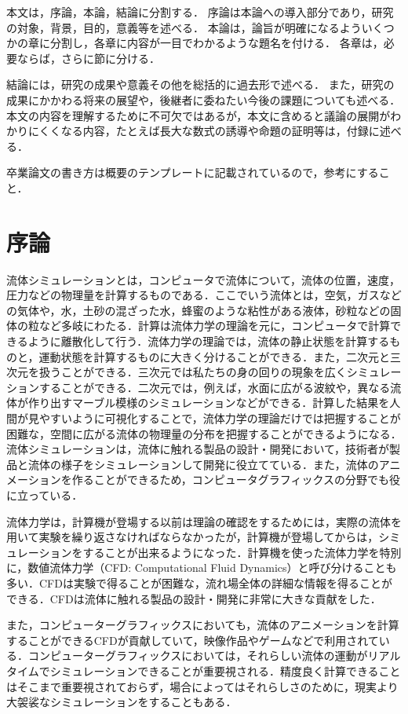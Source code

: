 \documentclass[a4j,12pt]{jreport}
\begin{document}
本文は，序論，本論，結論に分割する．
序論は本論への導入部分であり，研究の対象，背景，目的，意義等を述べる．
本論は，論旨が明確になるよういくつかの章に分割し，各章に内容が一目でわかるような題名を付ける．
各章は，必要ならば，さらに節に分ける．


結論には，研究の成果や意義その他を総括的に過去形で述べる．
また，研究の成果にかかわる将来の展望や，後継者に委ねたい今後の課題についても述べる．
本文の内容を理解するために不可欠ではあるが，本文に含めると議論の展開がわかりにくくなる内容，たとえば長大な数式の誘導や命題の証明等は，付録に述べる．


卒業論文の書き方は概要のテンプレートに記載されているので，参考にすること．



\chapter{序論} \label{chapter:2}

流体シミュレーションとは，コンピュータで流体について，流体の位置，速度，圧力などの物理量を計算するものである．ここでいう流体とは，空気，ガスなどの気体や，水，土砂の混ざった水，蜂蜜のような粘性がある液体，砂粒などの固体の粒など多岐にわたる．計算は流体力学の理論を元に，コンピュータで計算できるように離散化して行う．流体力学の理論では，流体の静止状態を計算するものと，運動状態を計算するものに大きく分けることができる．また，二次元と三次元を扱うことができる．三次元では私たちの身の回りの現象を広くシミュレーションすることができる．二次元では，例えば，水面に広がる波紋や，異なる流体が作り出すマーブル模様のシミュレーションなどができる．計算した結果を人間が見やすいように可視化することで，流体力学の理論だけでは把握することが困難な，空間に広がる流体の物理量の分布を把握することができるようになる．流体シミュレーションは，流体に触れる製品の設計・開発において，技術者が製品と流体の様子をシミュレーションして開発に役立てている．また，流体のアニメーションを作ることができるため，コンピュータグラフィックスの分野でも役に立っている．

流体力学は，計算機が登場する以前は理論の確認をするためには，実際の流体を用いて実験を繰り返さなければならなかったが，計算機が登場してからは，シミュレーションをすることが出来るようになった．計算機を使った流体力学を特別に，数値流体力学（CFD: Computational Fluid Dynamics）と呼び分けることも多い．CFDは実験で得ることが困難な，流れ場全体の詳細な情報を得ることができる．CFDは流体に触れる製品の設計・開発に非常に大きな貢献をした．

また，コンピューターグラフィックスにおいても，流体のアニメーションを計算することができるCFDが貢献していて，映像作品やゲームなどで利用されている．コンピューターグラフィックスにおいては，それらしい流体の運動がリアルタイムでシミュレーションできることが重要視される．精度良く計算できることはそこまで重要視されておらず，場合によってはそれらしさのために，現実より大袈裟なシミュレーションをすることもある．
\end{document}
